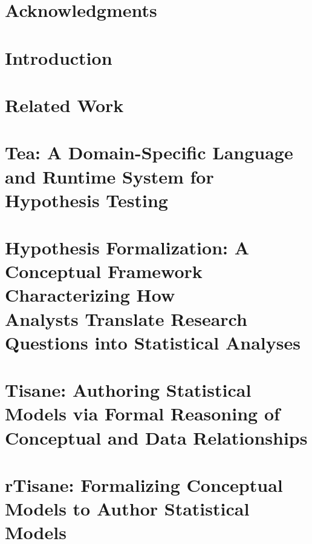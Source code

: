 \documentclass[11pt]{book}
\begin{document}
% 






{} %



\chapter*{Acknowledgments}



\tableofcontents{}
\listoffigures
\listoftables
\clearpage

\chapter{Introduction}


\chapter{Related Work}
\label{chapter:relatedWork}


\chapter{Tea: A Domain-Specific Language and Runtime System for Hypothesis Testing} %
\label{chapter:tea}


\chapter{Hypothesis Formalization: A Conceptual Framework Characterizing How\\Analysts Translate Research Questions into Statistical Analyses} %
\label{chapter:hypoForm}


\chapter{Tisane: Authoring Statistical Models via Formal Reasoning of Conceptual and Data Relationships}
\label{chapter:tisane}


\chapter{rTisane: Formalizing Conceptual Models to Author Statistical Models}
\label{chapter:rTisane}

\end{document}
